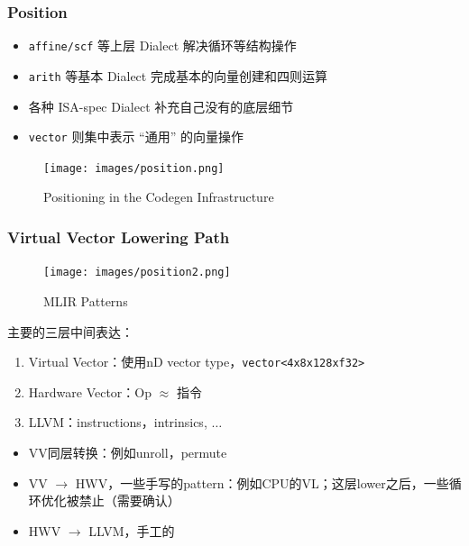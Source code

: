 \documentclass[aspectratio=169]{ctexbeamer}
\begin{document}
\begin{frame}
    \frametitle{Position}
    \begin{minipage}[t]{0.47\textwidth}
        \small
        \begin{itemize}
            \item \texttt{affine/scf} 等上层 Dialect 解决循环等结构操作
            \item \texttt{arith} 等基本 Dialect 完成基本的向量创建和四则运算
            \item 各种 ISA-spec Dialect 补充自己没有的底层细节
            \item \texttt{vector} 则集中表示 ``通用'' 的向量操作
        \end{itemize}
    \end{minipage}%
    \begin{minipage}[t]{0.5\textwidth}
        \begin{figure}
            \centering
            \texttt{[image: images/position.png]}
            \caption{Positioning in the Codegen Infrastructure}
        \end{figure}
    \end{minipage}
\end{frame}

\begin{frame}
    \frametitle{Virtual Vector Lowering Path}
    \noindent
    \begin{minipage}[t]{0.50\linewidth}
        \begin{figure}
            \centering
            \texttt{[image: images/position2.png]}
            \caption{MLIR Patterns}
        \end{figure}
    \end{minipage}%
    \hfill%
    \begin{minipage}[t]{0.45\linewidth}
        主要的三层中间表达：
        \begin{enumerate}
            \item Virtual Vector：使用nD vector type，\texttt{vector<4x8x128xf32>}
            \item Hardware Vector：Op $\approx$ 指令
            \item LLVM：instructions，intrinsics, $\dots$
        \end{enumerate}

        \begin{itemize}
            \item VV同层转换：例如unroll，permute
            \item VV $\rightarrow$ HWV，一些手写的pattern：例如CPU的VL；这层lower之后，一些循环优化被禁止（需要确认）
            \item HWV $\rightarrow$ LLVM，手工的
        \end{itemize}
    \end{minipage}
\end{frame}
\end{document}
